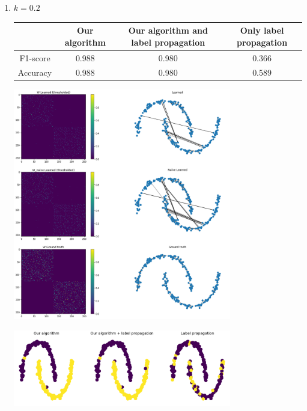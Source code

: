 \documentclass[a4paper]{article}
\begin{document}
\begin{enumerate}
    \item $k = 0.2$
        \begin{center}
            \begin{tabular}{|c|c|c|c|}
                \hline
                    & Our algorithm & Our algorithm and label propagation & Only label propagation\\
                \hline
                F1-score & 0.988 & 0.980 & 0.366 \\
                \hline
                Accuracy & 0.988 & 0.980 & 0.589 \\
                \hline
            \end{tabular}
        \end{center}
        \begin{center}
            \includegraphics[width=0.75\textwidth]{images/p2/20_percent_learned_graphs.png}
        \end{center}
        \begin{center}
            \includegraphics[width=0.75\textwidth]{images/p2/20_percent_predicted_labels.png}
        \end{center}

\end{enumerate}
\end{document}
